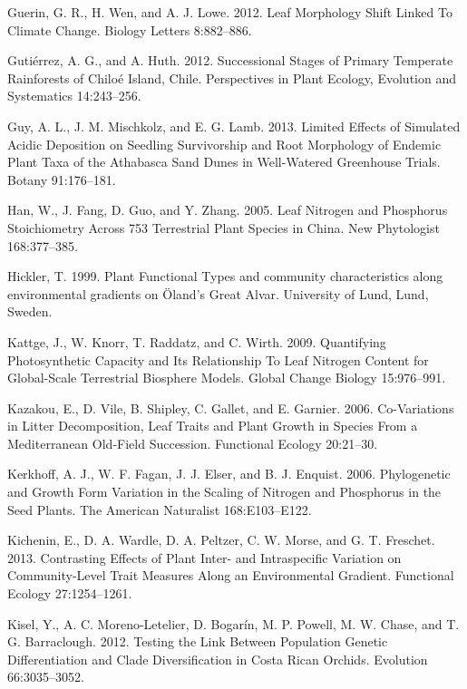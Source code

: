\documentclass[11pt]{article}
\begin{document}
\begin{hangparas}{1.5em}{1}
\hypertarget{citeproc_bib_item_53}{Guerin, G. R., H. Wen, and A. J. Lowe. 2012. Leaf Morphology Shift Linked To Climate Change. Biology Letters 8:882–886.}

\hypertarget{citeproc_bib_item_54}{Gutiérrez, A. G., and A. Huth. 2012. Successional Stages of Primary Temperate Rainforests of Chiloé Island, Chile. Perspectives in Plant Ecology, Evolution and Systematics 14:243–256.}

\hypertarget{citeproc_bib_item_55}{Guy, A. L., J. M. Mischkolz, and E. G. Lamb. 2013. Limited Effects of Simulated Acidic Deposition on Seedling Survivorship and Root Morphology of Endemic Plant Taxa of the Athabasca Sand Dunes in Well-Watered Greenhouse Trials. Botany 91:176–181.}

\hypertarget{citeproc_bib_item_56}{Han, W., J. Fang, D. Guo, and Y. Zhang. 2005. Leaf Nitrogen and Phosphorus Stoichiometry Across 753 Terrestrial Plant Species in China. New Phytologist 168:377–385.}

\hypertarget{citeproc_bib_item_57}{Hickler, T. 1999. Plant Functional Types and community characteristics along environmental gradients on Öland’s Great Alvar. University of Lund, Lund, Sweden.}

\hypertarget{citeproc_bib_item_58}{Kattge, J., W. Knorr, T. Raddatz, and C. Wirth. 2009. Quantifying Photosynthetic Capacity and Its Relationship To Leaf Nitrogen Content for Global-Scale Terrestrial Biosphere Models. Global Change Biology 15:976–991.}

\hypertarget{citeproc_bib_item_59}{Kazakou, E., D. Vile, B. Shipley, C. Gallet, and E. Garnier. 2006. Co-Variations in Litter Decomposition, Leaf Traits and Plant Growth in Species From a Mediterranean Old-Field Succession. Functional Ecology 20:21–30.}

\hypertarget{citeproc_bib_item_60}{Kerkhoff, A. J., W. F. Fagan, J. J. Elser, and B. J. Enquist. 2006. Phylogenetic and Growth Form Variation in the Scaling of Nitrogen and Phosphorus in the Seed Plants. The American Naturalist 168:E103–E122.}

\hypertarget{citeproc_bib_item_61}{Kichenin, E., D. A. Wardle, D. A. Peltzer, C. W. Morse, and G. T. Freschet. 2013. Contrasting Effects of Plant Inter- and Intraspecific Variation on Community-Level Trait Measures Along an Environmental Gradient. Functional Ecology 27:1254–1261.}

\hypertarget{citeproc_bib_item_62}{Kisel, Y., A. C. Moreno-Letelier, D. Bogarín, M. P. Powell, M. W. Chase, and T. G. Barraclough. 2012. Testing the Link Between Population Genetic Differentiation and Clade Diversification in Costa Rican Orchids. Evolution 66:3035–3052.}


\end{hangparas}
\end{document}
